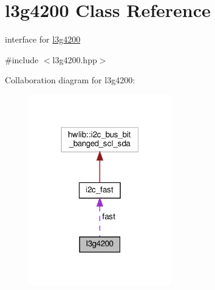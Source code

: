 \hypertarget{classl3g4200}{}\section{l3g4200 Class Reference}
\label{classl3g4200}


interface for \hyperlink{classl3g4200}{l3g4200}  




{\ttfamily \#include $<$l3g4200.\+hpp$>$}



Collaboration diagram for l3g4200\+:
\nopagebreak
\begin{figure}[H]
\begin{center}
\leavevmode
\includegraphics[width=175pt]{classl3g4200__coll__graph}
\end{center}
\end{figure}
